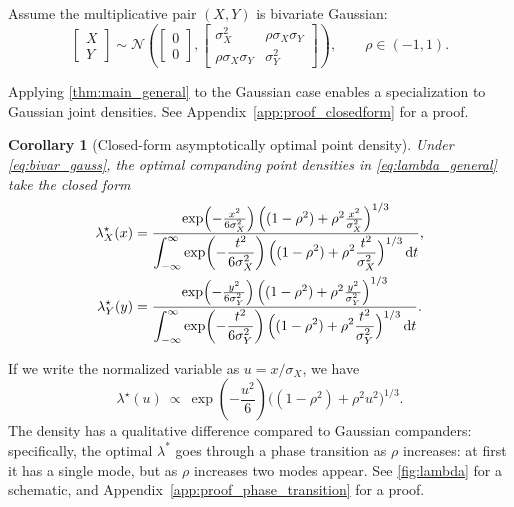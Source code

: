 \documentclass{article}
\newtheorem{corollary}{Corollary}
\newcommand{\dd}{\,\mathrm{d}}
\begin{document}
Assume the multiplicative pair $(X,Y)$ is bivariate Gaussian:
\begin{equation}\label{eq:bivar_gauss}
\begin{bmatrix}X\\Y\end{bmatrix}
\sim \mathcal{N}\!\left(
\begin{bmatrix}0\\0\end{bmatrix},
\begin{bmatrix}
\sigma_X^2 & \rho\sigma_X\sigma_Y\\
\rho\sigma_X\sigma_Y & \sigma_Y^2
\end{bmatrix}\right),\qquad \rho\in(-1,1).
\end{equation}

Applying \cref{thm:main_general} to the Gaussian case enables a specialization to Gaussian joint densities. See Appendix~\ref{app:proof_closedform} for a proof.
\begin{corollary}
[Closed-form asymptotically optimal point density]\label{thm:closedform_density}
Under \eqref{eq:bivar_gauss}, the optimal companding point densities in \eqref{eq:lambda_general} take the closed form
\begin{align*}
\lambda_X^\star(x)
&=
\frac{
\exp\!\left(-\frac{x^2}{6\sigma_X^2}\right)\Bigl((1-\rho^2)+\rho^2\frac{x^2}{\sigma_X^2}\Bigr)^{1/3}
}{
\displaystyle \int_{-\infty}^{\infty}
\exp\!\left(-\frac{t^2}{6\sigma_X^2}\right)\Bigl((1-\rho^2)+\rho^2\frac{t^2}{\sigma_X^2}\Bigr)^{1/3}\dd t
},\\
\lambda_Y^\star(y)
&=
\frac{
\exp\!\left(-\frac{y^2}{6\sigma_Y^2}\right)\Bigl((1-\rho^2)+\rho^2\frac{y^2}{\sigma_Y^2}\Bigr)^{1/3}
}{
\displaystyle \int_{-\infty}^{\infty}
\exp\!\left(-\frac{t^2}{6\sigma_Y^2}\right)\Bigl((1-\rho^2)+\rho^2\frac{t^2}{\sigma_Y^2}\Bigr)^{1/3}\dd t
}.
\end{align*}
\end{corollary}

If we write the normalized variable as $u=x/\sigma_X$, we have
\[
\lambda^\star(u)\ \propto\ \exp\!\left(-\frac{u^2}{6}\right)\bigl((1-\rho^2)+\rho^2u^2\bigr)^{1/3}.
\]
The density has a qualitative difference compared to Gaussian companders: specifically, the optimal $\lambda^{*}$ goes through a phase transition as $\rho$ increases: at first it has a single mode, but as $\rho$ increases two modes appear. See \cref{fig:lambda} for a schematic, and Appendix~\ref{app:proof_phase_transition} for a proof. 
\end{document}
